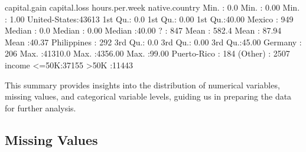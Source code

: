 \documentclass[
  11pt,
]{book}
\makeatletter
\newenvironment{Shaded}{}{}
\newcommand{\DecValTok}[1]{#1}
\newcommand{\FloatTok}[1]{#1}
\newcommand{\NormalTok}[1]{#1}
\newcommand{\SpecialCharTok}[1]{\textcolor[rgb]{0.39,0.39,0.39}{#1}}
\newenvironment{kframe}{%
\medskip{}
\setlength{\fboxsep}{.8em}
 \def\at@end@of@kframe{}%
 \ifinner\ifhmode%
  \def\at@end@of@kframe{\end{minipage}}%
  \begin{minipage}{\columnwidth}%
 \fi\fi%
 \def\FrameCommand##1{\hskip\@totalleftmargin \hskip-\fboxsep
 \colorbox{shadecolor}{##1}\hskip-\fboxsep
     \hskip-\linewidth \hskip-\@totalleftmargin \hskip\columnwidth}%
 \MakeFramed {\advance\hsize-\width
   \@totalleftmargin\z@ \linewidth\hsize
   \@setminipage}}%
 {\par\unskip\endMakeFramed%
 \at@end@of@kframe}
\renewenvironment{Shaded}{\begin{kframe}}{\end{kframe}}
\theoremstyle{definition}
\theoremstyle{definition}
\theoremstyle{definition}
\theoremstyle{definition}
\theoremstyle{remark}
\makeatother
\begin{document}
\begin{Shaded}
\begin{Highlighting}[]
\NormalTok{     capital.gain      capital.loss     hours.per.week        native.country }
\NormalTok{    Min.   }\SpecialCharTok{:}    \FloatTok{0.0}\NormalTok{   Min.   }\SpecialCharTok{:}   \FloatTok{0.00}\NormalTok{   Min.   }\SpecialCharTok{:} \FloatTok{1.00}\NormalTok{   United}\SpecialCharTok{{-}}\NormalTok{States}\SpecialCharTok{:}\DecValTok{43613}  
    \DecValTok{1}\NormalTok{st Qu.}\SpecialCharTok{:}    \FloatTok{0.0}   \DecValTok{1}\NormalTok{st Qu.}\SpecialCharTok{:}   \FloatTok{0.00}   \DecValTok{1}\NormalTok{st Qu.}\SpecialCharTok{:}\FloatTok{40.00}\NormalTok{   Mexico       }\SpecialCharTok{:}  \DecValTok{949}  
\NormalTok{    Median }\SpecialCharTok{:}    \FloatTok{0.0}\NormalTok{   Median }\SpecialCharTok{:}   \FloatTok{0.00}\NormalTok{   Median }\SpecialCharTok{:}\FloatTok{40.00}\NormalTok{   ?            }\SpecialCharTok{:}  \DecValTok{847}  
\NormalTok{    Mean   }\SpecialCharTok{:}  \FloatTok{582.4}\NormalTok{   Mean   }\SpecialCharTok{:}  \FloatTok{87.94}\NormalTok{   Mean   }\SpecialCharTok{:}\FloatTok{40.37}\NormalTok{   Philippines  }\SpecialCharTok{:}  \DecValTok{292}  
    \DecValTok{3}\NormalTok{rd Qu.}\SpecialCharTok{:}    \FloatTok{0.0}   \DecValTok{3}\NormalTok{rd Qu.}\SpecialCharTok{:}   \FloatTok{0.00}   \DecValTok{3}\NormalTok{rd Qu.}\SpecialCharTok{:}\FloatTok{45.00}\NormalTok{   Germany      }\SpecialCharTok{:}  \DecValTok{206}  
\NormalTok{    Max.   }\SpecialCharTok{:}\FloatTok{41310.0}\NormalTok{   Max.   }\SpecialCharTok{:}\FloatTok{4356.00}\NormalTok{   Max.   }\SpecialCharTok{:}\FloatTok{99.00}\NormalTok{   Puerto}\SpecialCharTok{{-}}\NormalTok{Rico  }\SpecialCharTok{:}  \DecValTok{184}  
\NormalTok{                                                        (Other)      }\SpecialCharTok{:} \DecValTok{2507}  
\NormalTok{      income     }
    \SpecialCharTok{\textless{}=}\DecValTok{50}\NormalTok{K}\SpecialCharTok{:}\DecValTok{37155}  
    \SpecialCharTok{\textgreater{}}\DecValTok{50}\NormalTok{K }\SpecialCharTok{:}\DecValTok{11443}  
                 
                 
                 
                 
   
\end{Highlighting}
\end{Shaded}

This summary provides insights into the distribution of numerical variables, missing values, and categorical variable levels, guiding us in preparing the data for further analysis.

\subsection{Missing Values}\label{missing-values-1}
\end{document}
